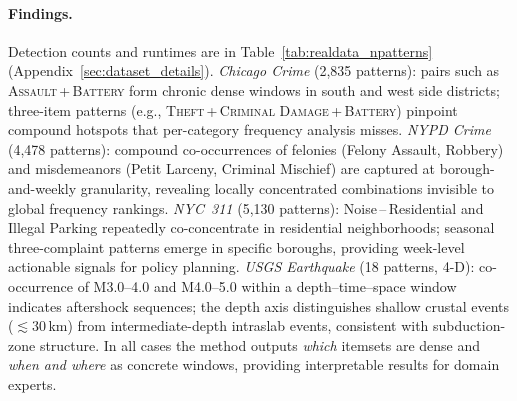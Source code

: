 \paragraph{Findings.}
Detection counts and runtimes are in Table~\ref{tab:realdata_npatterns} (Appendix~\ref{sec:dataset_details}).
\emph{Chicago Crime} (2,835 patterns):
pairs such as \textsc{Assault}\,+\,\textsc{Battery} form chronic dense windows
in south and west side districts;
three-item patterns (e.g., \textsc{Theft}\,+\,\textsc{Criminal Damage}\,+\,\textsc{Battery})
pinpoint compound hotspots that per-category frequency analysis misses.
\emph{NYPD Crime} (4,478 patterns):
compound co-occurrences of felonies (Felony Assault, Robbery) and
misdemeanors (Petit Larceny, Criminal Mischief)
are captured at borough-and-weekly granularity,
revealing locally concentrated combinations invisible to global frequency rankings.
\emph{NYC~311} (5,130 patterns):
Noise\,--\,Residential and Illegal Parking repeatedly co-concentrate
in residential neighborhoods;
seasonal three-complaint patterns emerge in specific boroughs,
providing week-level actionable signals for policy planning.
\emph{USGS Earthquake} (18 patterns, 4-D):
co-occurrence of M3.0--4.0 and M4.0--5.0 within a depth--time--space window
indicates aftershock sequences;
the depth axis distinguishes shallow crustal events (${\lesssim}30$\,km)
from intermediate-depth intraslab events,
consistent with subduction-zone structure.
In all cases the method outputs \emph{which} itemsets are dense and
\emph{when and where} as concrete windows,
providing interpretable results for domain experts.
